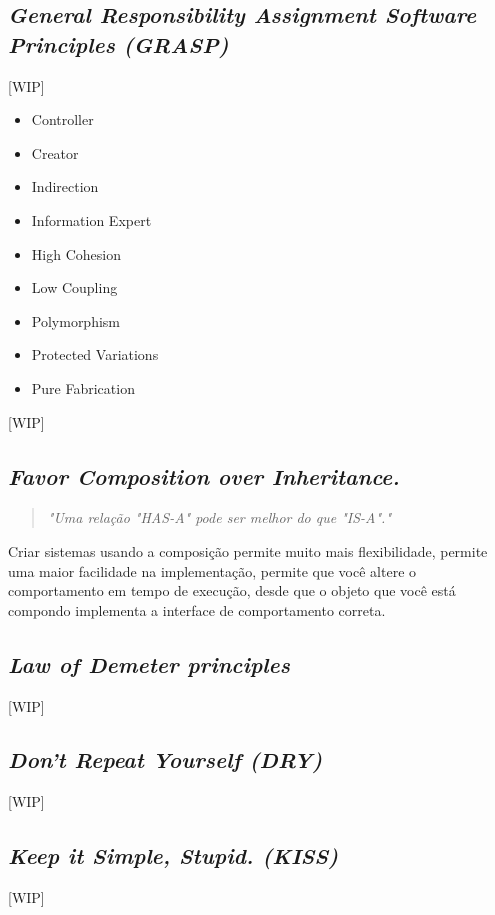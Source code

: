 \documentclass[12pt]{article}
\begin{document}
\subsection{\textit{General Responsibility Assignment Software Principles (GRASP)}} \label{sec:grasp}
[WIP]
\begin{itemize}
	\item Controller	
	\item Creator
	\item Indirection
	\item Information Expert
	\item High Cohesion
	\item Low Coupling
	\item Polymorphism
	\item Protected Variations
	\item Pure Fabrication
\end{itemize}
[WIP]

\subsection{\textit{Favor Composition over Inheritance.}} \label{sec:favor_composition}
\begin{quote}
\textit{"Uma relação "HAS-A" pode ser melhor do que "IS-A"."}\cite{HEADFIRST_DESIGN_PATTERN}
\end{quote}

Criar sistemas usando a composição permite muito mais flexibilidade, permite uma maior facilidade na implementação, permite que você altere o comportamento em tempo de execução, desde que o objeto que você está compondo implementa a interface de comportamento correta. 


\subsection{\textit{Law of Demeter principles}} \label{sec:law_of_demeter}
[WIP]

\subsection{\textit{Don't Repeat Yourself (DRY)}} \label{sec:dey}
[WIP]

\subsection{\textit{Keep it Simple, Stupid. (KISS)}} \label{sec:kiss}
[WIP]
\end{document}

